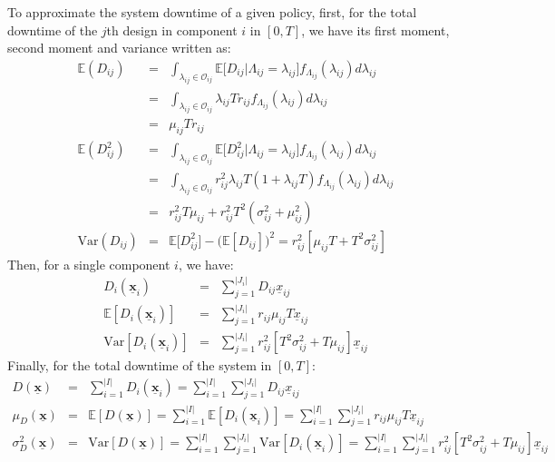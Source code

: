 \documentclass[preprint,12pt]{elsarticle}
\begin{document}
To approximate the system downtime of a given policy, first, for the total downtime of the $j$th design in component $i$ in $[0, T]$, we have its first moment, second moment and variance written as:
\small
\begin{eqnarray}
\mathbb{E}(D_{ij}) &=& \int_{\lambda_{ij}\in \mathcal O_{ij}}\mathbb{E}\bigg[D_{ij} \bigg\vert \Lambda_{ij}=\lambda_{ij}\bigg]f_{\Lambda_{ij}}(\lambda_{ij})d\lambda_{ij} \nonumber\\
 &=& \int_{\lambda_{ij}\in \mathcal O_{ij} } \lambda_{ij}T r_{ij}f_{\Lambda_{ij}}(\lambda_{ij})d\lambda_{ij} \nonumber\\
 &=& \mu_{ij} T r_{ij}\\
\mathbb{E}(D^{2}_{ij}) &=& \int_{\lambda_{ij}\in \mathcal O_{ij}}\mathbb{E}\bigg[D^{2}_{ij} \bigg\vert \Lambda_{ij}=\lambda_{ij}\bigg]f_{\Lambda_{ij}}(\lambda_{ij})d\lambda_{ij}  \nonumber\\
&=& \int_{\lambda_{ij}\in \mathcal O_{ij}} {r^{2}_{ij}\lambda_{ij}T(1+\lambda_{ij}T)f_{\Lambda_{ij}}(\lambda_{ij})d\lambda_{ij}} \nonumber\\
&=& r^{2}_{ij}T\mu_{ij} + r^{2}_{ij}T^{2}(\sigma^{2}_{ij}+\mu^{2}_{ij}) \\
\textrm{Var}(D_{ij})&=&\mathbb{E}\bigg[D^{2}_{ij}\bigg] - \bigg(\mathbb{E}[D_{ij}]\bigg)^{2}=r^{2}_{ij}[\mu_{ij}T + T^{2}\sigma^{2}_{ij}]
\end{eqnarray}
\normalsize
Then, for a single component $i$, we have:
\small
\begin{eqnarray}
D_{i}(\boldsymbol{\underline{x}}_{i}) &=& \sum_{j=1}^{\lvert J_{i}\rvert}{D_{ij}\underline{x}_{ij}}\\
\mathbb{E}[D_{i}(\boldsymbol{\underline{x}}_{i})] &=&\sum_{j=1}^{\lvert J_{i} \rvert}{r_{ij}\mu_{ij}T\underline{x}_{ij}} \\
\textrm{Var}[D_{i}(\boldsymbol{\underline{x}}_{i})]&=&\sum_{j=1}^{\lvert J_{i} \rvert}{r_{ij}^{2}[T^{2}\sigma^{2}_{ij}+T\mu_{ij}]\underline{x}_{ij}}
\end{eqnarray}
\normalsize
Finally, for the total downtime of the system in $[0, T]$:
\small
\begin{eqnarray}
D(\boldsymbol{\underline{x}}) &=& \sum_{i=1}^{\lvert I \rvert}D_{i}(\boldsymbol{\underline{x}}_{i})
=\sum_{i=1}^{\lvert I \rvert}\sum_{j=1}^{\lvert J_{i}\rvert}{D_{ij}\underline{x}_{ij}}  \\
\mu_{D}(\boldsymbol{\underline{x}})&=&\mathbb{E}[D(\boldsymbol{\underline{x}})] = \sum^{\lvert I \rvert}_{i=1}\mathbb{E}[D_{i}(\boldsymbol{\underline{x}}_{i})] = \sum^{\lvert I \rvert}_{i=1} \sum_{j=1}^{\lvert J_{i} \rvert}{r_{ij}\mu_{ij}T\underline{x}_{ij}} \label{expdowntime}\\
\sigma^{2}_{D}(\boldsymbol{\underline{x}})&=&\textrm{Var}[D(\boldsymbol{\underline{x}})] = \sum_{i=1}^{\lvert I \rvert} \sum_{j=1}^{\lvert J_{i} \rvert}\textrm{Var}[D_{i}(\boldsymbol{\underline{x}}_{i})] = \sum_{i=1}^{\lvert I \rvert}\sum_{j=1}^{\lvert J_{i} \rvert}r_{ij}^{2}[T^{2}\sigma^{2}_{ij}+T\mu_{ij}]\underline{x}_{ij} \label{vardowntime}
\end{eqnarray}
\end{document}
